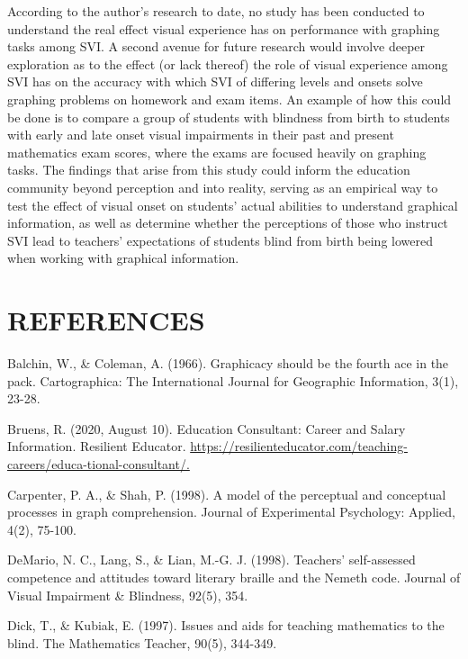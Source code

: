 \documentclass[11.5pt]{sig-alternate} %
\begin{document}
\begin{large}
According to the author’s research to date, no study has been conducted to understand the real effect visual experience has on performance with graphing tasks among SVI. A second avenue for future research would involve deeper exploration as to the effect (or lack thereof) the role of visual experience among SVI has on the accuracy with which SVI of differing levels and onsets solve graphing problems on homework and exam items. An example of how this could be done is to compare a group of students with blindness from birth to students with early and late onset visual impairments in their past and present mathematics exam scores, where the exams are focused heavily on graphing tasks. The findings that arise from this study could inform the education community beyond perception and into reality, serving as an empirical way to test the effect of visual onset on students’ actual abilities to understand graphical information, as well as determine whether the perceptions of those who instruct SVI lead to teachers’ expectations of students blind from birth being lowered when working with graphical information.

\end{large}
\clearpage
\section*{REFERENCES}\par 

\leftskip 0.25in
\parindent -0.25in 

Balchin, W., \& Coleman, A. (1966). Graphicacy should be the fourth ace in the pack. Cartographica: The International Journal for Geographic Information, 3(1), 23-28.

Bruens, R. (2020, August 10). Education Consultant: Career and Salary Information. Resilient Educator. \url{https://resilienteducator.com/teaching-careers/educa-tional-consultant/.}

Carpenter, P. A., \& Shah, P. (1998). A model of the perceptual and conceptual processes in graph comprehension. Journal of Experimental Psychology: Applied, 4(2), 75-100.

DeMario, N. C., Lang, S., \& Lian, M.-G. J. (1998). Teachers' self-assessed competence and attitudes toward literary braille and the Nemeth code. Journal of Visual Impairment \& Blindness, 92(5), 354.

Dick, T., \& Kubiak, E. (1997). Issues and aids for teaching mathematics to the blind. The Mathematics Teacher, 90(5), 344-349.
\end{document}
